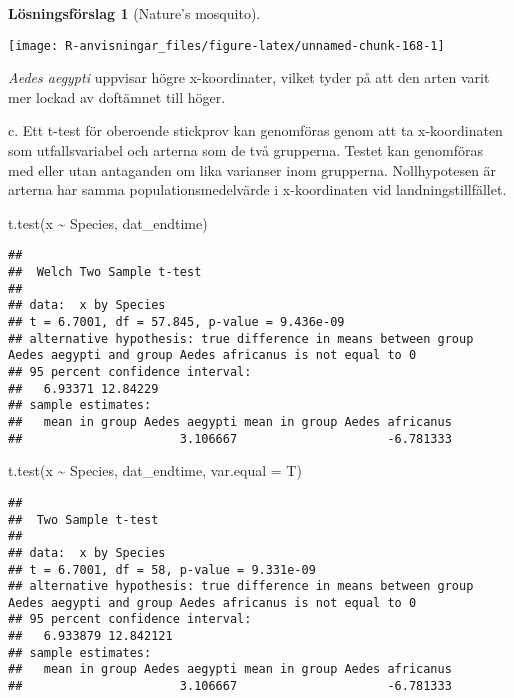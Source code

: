 \documentclass[
]{book}
\newenvironment{Shaded}{\begin{snugshade}}{\end{snugshade}}
\newcommand{\AttributeTok}[1]{\textcolor[rgb]{0.77,0.63,0.00}{#1}}
\newcommand{\FunctionTok}[1]{\textcolor[rgb]{0.00,0.00,0.00}{#1}}
\newcommand{\NormalTok}[1]{#1}
\newcommand{\SpecialCharTok}[1]{\textcolor[rgb]{0.00,0.00,0.00}{#1}}
\theoremstyle{definition}
\theoremstyle{definition}
\theoremstyle{definition}
\theoremstyle{definition}
\newtheorem{hypothesis}{Lösningsförslag}[chapter]
\theoremstyle{remark}
\begin{document}
\begin{hypothesis}[Nature's mosquito]
\begin{center}\texttt{[image: R-anvisningar\_files/figure-latex/unnamed-chunk-168-1]} \end{center}

\emph{Aedes aegypti} uppvisar högre x-koordinater, vilket tyder på att den arten varit mer lockad av doftämnet till höger.

c. Ett t-test för oberoende stickprov kan genomföras genom att ta x-koordinaten som utfallsvariabel och arterna som de två grupperna. Testet kan genomföras med eller utan antaganden om lika varianser inom grupperna. Nollhypotesen är arterna har samma populationsmedelvärde i x-koordinaten vid landningstillfället.

\begin{Shaded}
\begin{Highlighting}[]
\FunctionTok{t.test}\NormalTok{(x }\SpecialCharTok{\textasciitilde{}}\NormalTok{ Species, dat\_endtime)}
\end{Highlighting}
\end{Shaded}

\begin{verbatim}
## 
##  Welch Two Sample t-test
## 
## data:  x by Species
## t = 6.7001, df = 57.845, p-value = 9.436e-09
## alternative hypothesis: true difference in means between group Aedes aegypti and group Aedes africanus is not equal to 0
## 95 percent confidence interval:
##   6.93371 12.84229
## sample estimates:
##   mean in group Aedes aegypti mean in group Aedes africanus 
##                      3.106667                     -6.781333
\end{verbatim}

\begin{Shaded}
\begin{Highlighting}[]
\FunctionTok{t.test}\NormalTok{(x }\SpecialCharTok{\textasciitilde{}}\NormalTok{ Species, dat\_endtime, }\AttributeTok{var.equal =}\NormalTok{ T)}
\end{Highlighting}
\end{Shaded}

\begin{verbatim}
## 
##  Two Sample t-test
## 
## data:  x by Species
## t = 6.7001, df = 58, p-value = 9.331e-09
## alternative hypothesis: true difference in means between group Aedes aegypti and group Aedes africanus is not equal to 0
## 95 percent confidence interval:
##   6.933879 12.842121
## sample estimates:
##   mean in group Aedes aegypti mean in group Aedes africanus 
##                      3.106667                     -6.781333
\end{verbatim}


\end{hypothesis}
\end{document}
